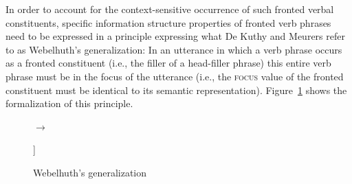 \documentclass[output=paper]{langsci/langscibook}
\begin{document}
In order to account for the context-sensitive occurrence of such
fronted verbal constituents, specific information structure properties
of fronted verb phrases need to be expressed in a principle expressing
what De Kuthy and Meurers refer to as Webelhuth's generalization: In
an utterance in which a verb phrase occurs as a fronted constituent
(i.e., the filler of a head-filler phrase) this entire verb phrase
must be in the focus of the utterance (i.e., the \textsc{focus} value
of the fronted constituent must be identical to its semantic
representation).  Figure~\ref{fig:webelhuths-generalization} shows the
formalization of this principle.


\begin{figure}[htb!]
\bigskip
\begin{flushleft}
\qquad\begin{avm}
\end{avm}
$\to$\ 
\end{flushleft}
\begin{flushright}
\begin{avm}
  [info-struc|focus <@1>\\
  non-head-dtr  [info-struc|focus & <@1>\\
  synsem|loc|cont|lf & @1]]\qquad
\end{avm}\medskip
\caption{Webelhuth's generalization}
\label{fig:webelhuths-generalization}
\end{flushright}\unskip
\end{figure}  
\end{document}
